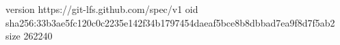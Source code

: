 version https://git-lfs.github.com/spec/v1
oid sha256:33b3ae5fc120c0c2235e142f34b1797454daeaf5bce8b8dbbad7ea9f8d7f5ab2
size 262240
